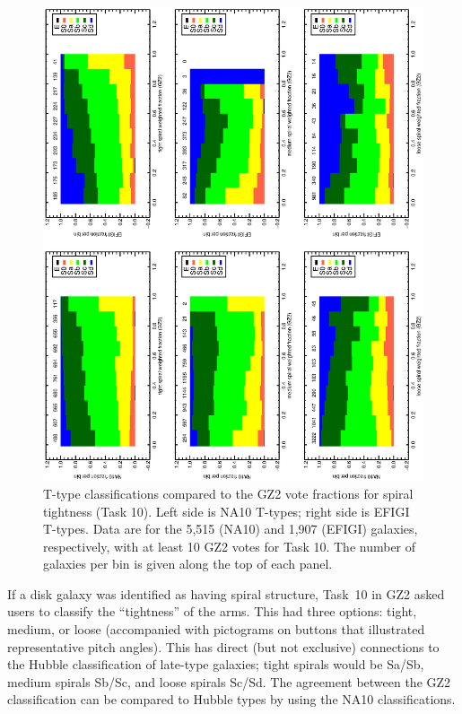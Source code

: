\documentclass[useAMS,usenatbib]{mn2e}
\begin{document}
\begin{figure}
\includegraphics[angle=-90,width=7.0in]{figures/spiraltightness_color.ps}
\caption{T-type classifications compared to the GZ2 vote fractions for spiral tightness (Task 10). Left side is NA10 T-types; right side is EFIGI T-types. Data are for the 5,515 (NA10) and 1,907 (EFIGI) galaxies, respectively, with at least 10 GZ2 votes for Task 10. The number of galaxies per bin is given along the top of each panel. 
\label{fig-spiraltightness}}
\end{figure}

If a disk galaxy was identified as having spiral structure, Task~10 in GZ2 asked users to classify the ``tightness'' of the arms. This had three options: tight, medium, or loose (accompanied with pictograms on buttons that illustrated representative pitch angles). This has direct (but not exclusive) connections to the Hubble classification of late-type galaxies; tight spirals would be Sa/Sb, medium spirals Sb/Sc, and loose spirals Sc/Sd. The agreement between the GZ2 classification can be compared to Hubble types by using the NA10 classifications. 
\end{document}
